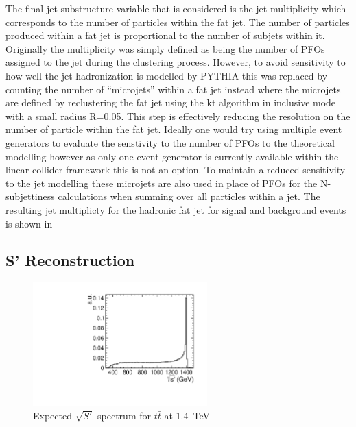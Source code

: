 The final jet substructure variable that is considered is the jet multiplicity which corresponds to the number of particles within the fat jet. The number of particles produced within a fat jet is proportional to the number of subjets within it. Originally the multiplicity was simply defined as being the number of \ac{PFO}s assigned to the jet during the clustering process. However, to avoid sensitivity to how well the jet hadronization is modelled by PYTHIA this was replaced by counting the number of ``microjets'' within a fat jet instead where the microjets are defined by reclustering the fat jet using the kt algorithm in inclusive mode with a small radius R=0.05. This step is effectively reducing the resolution on the number of particle within the fat jet. Ideally one would try using multiple event generators to evaluate the senstivity to the number of PFOs to the theoretical modelling however as only one event generator is currently available within the linear collider framework this is not an option. To maintain a reduced sensitivity to the jet modelling these microjets are also used in place of PFOs for the N-subjettiness calculations when summing over all particles within a jet. The resulting jet multiplicty for the hadronic fat jet for signal and background events is shown in 



\subsection{S' Reconstruction}
\label{sec:sprime}
\begin{figure}
  \centering
  \includegraphics[width=0.6\textwidth]{TopAnalysis/figures/GeneratorSPrime.pdf}
  \caption[Expected $\sqrt{S'}$ spectrum for $t\bar{t}$ at 1.4~TeV]{Expected $\sqrt{S'}$ spectrum for $t\bar{t}$ at 1.4~TeV}
  \label{fig:trueSPrime}
\end{figure}

